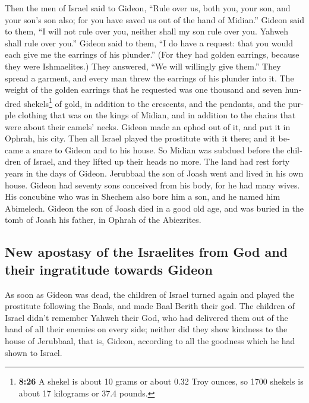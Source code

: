 \begin{paracol}{2}
\begin{otherlanguage}{english}
 Then the men of Israel said to Gideon, ``Rule over us,
both you, your son, and your son's son also; for you have saved us out
of the hand of Midian.''  Gideon said to them, ``I will
not rule over you, neither shall my son rule over you. Yahweh shall rule
over you.''  Gideon said to them, ``I do have a request:
that you would each give me the earrings of his plunder.'' (For they had
golden earrings, because they were Ishmaelites.)  They
answered, ``We will willingly give them.'' They spread a garment, and
every man threw the earrings of his plunder into it.  The
weight of the golden earrings that he requested was one thousand and
seven hundred shekels\footnote{\textbf{8:26} A shekel is about 10 grams
  or about 0.32 Troy ounces, so 1700 shekels is about 17 kilograms or
  37.4 pounds.} of gold, in addition to the crescents, and the pendants,
and the purple clothing that was on the kings of Midian, and in addition
to the chains that were about their camels' necks. 
Gideon made an ephod out of it, and put it in Ophrah, his city. Then all
Israel played the prostitute with it there; and it became a snare to
Gideon and to his house.  So Midian was subdued before
the children of Israel, and they lifted up their heads no more. The land
had rest forty years in the days of Gideon.  Jerubbaal
the son of Joash went and lived in his own house.  Gideon
had seventy sons conceived from his body, for he had many wives.
 His concubine who was in Shechem also bore him a son,
and he named him Abimelech.  Gideon the son of Joash died
in a good old age, and was buried in the tomb of Joash his father, in
Ophrah of the Abiezrites.

\hypertarget{new-apostasy-of-the-israelites-from-god-and-their-ingratitude-towards-gideon}{%
\subsection{New apostasy of the Israelites from God and their
ingratitude towards
Gideon}\label{new-apostasy-of-the-israelites-from-god-and-their-ingratitude-towards-gideon}}

 As soon as Gideon was dead, the children of Israel
turned again and played the prostitute following the Baals, and made
Baal Berith their god.  The children of Israel didn't
remember Yahweh their God, who had delivered them out of the hand of all
their enemies on every side;  neither did they show
kindness to the house of Jerubbaal, that is, Gideon, according to all
the goodness which he had shown to Israel.


\end{otherlanguage}
\end{paracol}
